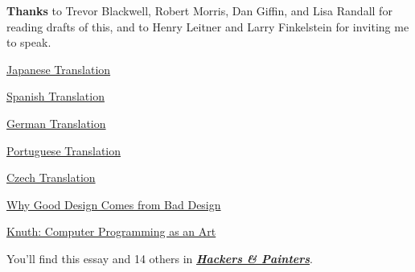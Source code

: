 \textbf{Thanks} to Trevor Blackwell, Robert Morris, Dan Giffin, and Lisa
Randall for reading drafts of this, and to Henry Leitner
and Larry Finkelstein for inviting me to speak.


\href{http://www.shiro.dreamhost.com/scheme/trans/hp-j.html}{Japanese Translation}

\href{http://kapcoweb.com/p/hackers-y-pintores}{Spanish Translation}

\href{http://www.langatigma.org/trans/hm.html}{German Translation}

\href{http://www.sounerd.com.br/index.php?option=com\_content\&task=view\&id=203\&Itemid=43}{Portuguese Translation}

\href{http://blog.zvestov.cz/item/135}{Czech Translation}

\href{http://www.uiweb.com/issues/issue08.htm}{Why Good Design Comes from Bad Design}

\href{http://www.paulgraham.com/knuth.html}{Knuth: Computer Programming as an Art}







You'll find this essay and 14 others in
\href{http://www.amazon.com/gp/product/0596006624}{\textbf{\emph{Hackers \& Painters}}}.


